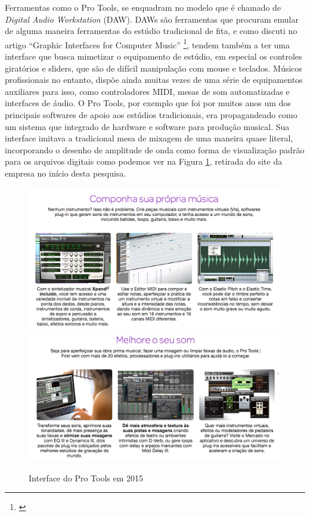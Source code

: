 Ferramentas como o Pro Tools, se enquadram no modelo que é chamado de \emph{Digital Audio Workstation} (DAW). DAWs são ferramentas que procuram emular de alguma maneira ferramentas do estúdio tradicional de fita, e como discuti no artigo ``Graphic Interfaces for Computer Music'' \footnote{\cite{Stolfi2016}}, tendem também a ter uma interface que busca mimetizar o equipamento de estúdio, em especial os controles giratórios e sliders, que são de difícil manipulação com mouse e teclados. Músicos profissionais no entanto, dispõe ainda muitas vezes de uma série de equipamentos auxiliares para isso, como controladores MIDI, mesas de som automatizadas e interfaces de áudio. O Pro Tools, por exemplo que foi por muitos anos um dos principais softwares de apoio aos estúdios tradicionais, era propagandeado como um sistema que integrado de hardware e software para produção musical. Sua interface imitava a tradicional mesa de mixagem de uma maneira quase literal, incorporando o desenho de amplitude de onda como forma de visualização padrão para os arquivos digitais como podemos ver na Figura \ref{protools}, retirada do site da empresa no início desta pesquisa.


\begin{figure}
    \caption{\label{protools}Interface do Pro Tools em 2015 }
    
        \includegraphics[width=0.8\linewidth]{pictures/protools}
        \includegraphics[width=0.8\linewidth]{pictures/protools2}
    
\end{figure}

